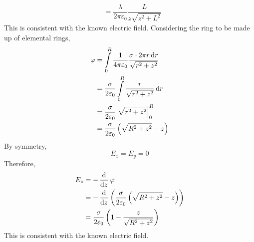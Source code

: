 \documentclass[fleqn, a4paper, 10pt, oneside]{scrartcl}
\theoremstyle{definition}
\theoremstyle{theorem}
\begin{document}
\begin{solution}
\begin{tasks}
\begin{align*}
				&= \dfrac{\lambda}{2 \pi \varepsilon_0} \dfrac{L}{z \sqrt{z^2 + L^2}}
			\end{align*}
			This is consistent with the known electric field.
		\task
			Considering the ring to be made up of elemental rings,
			\begin{align*}
				\varphi &= \int\limits_{0}^{R} \dfrac{1}{4 \pi \varepsilon_0} \dfrac{\sigma \cdot 2 \pi r \dif r}{\sqrt{r^2 + z^2}}\\
				&= \dfrac{\sigma}{2 \varepsilon_0} \int\limits_{0}^{R} \dfrac{r}{\sqrt{r^2 + z^2}} \dif r\\
				&= \dfrac{\sigma}{2 \varepsilon_0} \left. \sqrt{r^2 + z^2} \right|_{0}^{R}\\
				&= \dfrac{\sigma}{2 \varepsilon_0} \left( \sqrt{R^2 + z^2} - z \right)
			\end{align*}
			By symmetry,
			\begin{equation*}
				E_x = E_y = 0
			\end{equation*}
			Therefore,
			\begin{align*}
				E_z &= -\dod{}{z} \varphi\\
				&= -\dod{}{z} \left( \dfrac{\sigma}{2 \varepsilon_0} \left( \sqrt{R^2 + z^2} - z \right) \right)\\
				&= \dfrac{\sigma}{2 \varepsilon_0} \left( 1 - \dfrac{z}{\sqrt{R^2 + z^2}} \right)
			\end{align*}
			This is consistent with the known electric field.
	\end{tasks}
\end{solution}
\end{document}
